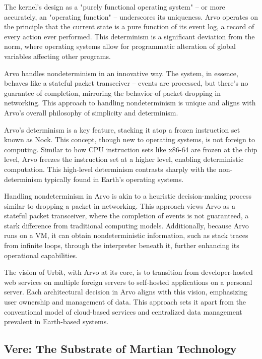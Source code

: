 \documentclass[twoside]{article}
\begin{document}
The kernel's design as a "purely functional operating system" – or more accurately, an "operating function" – underscores its uniqueness. Arvo operates on the principle that the current state is a pure function of its event log, a record of every action ever performed. This determinism is a significant deviation from the norm, where operating systems allow for programmatic alteration of global variables affecting other programs.

Arvo handles nondeterminism in an innovative way. The system, in essence, behaves like a stateful packet transceiver – events are processed, but there's no guarantee of completion, mirroring the behavior of packet dropping in networking. This approach to handling nondeterminism is unique and aligns with Arvo's overall philosophy of simplicity and determinism.

Arvo's determinism is a key feature, stacking it atop a frozen instruction set known as Nock. This concept, though new to operating systems, is not foreign to computing. Similar to how CPU instruction sets like x86-64 are frozen at the chip level, Arvo freezes the instruction set at a higher level, enabling deterministic computation. This high-level determinism contrasts sharply with the non-determinism typically found in Earth's operating systems.

Handling nondeterminism in Arvo is akin to a heuristic decision-making process similar to dropping a packet in networking. This approach views Arvo as a stateful packet transceiver, where the completion of events is not guaranteed, a stark difference from traditional computing models. Additionally, because Arvo runs on a VM, it can obtain nondeterministic information, such as stack traces from infinite loops, through the interpreter beneath it, further enhancing its operational capabilities.

The vision of Urbit, with Arvo at its core, is to transition from developer-hosted web services on multiple foreign servers to self-hosted applications on a personal server. Each architectural decision in Arvo aligns with this vision, emphasizing user ownership and management of data. This approach sets it apart from the conventional model of cloud-based services and centralized data management prevalent in Earth-based systems.

\subsection{Vere: The Substrate of Martian Technology}
\end{document}
